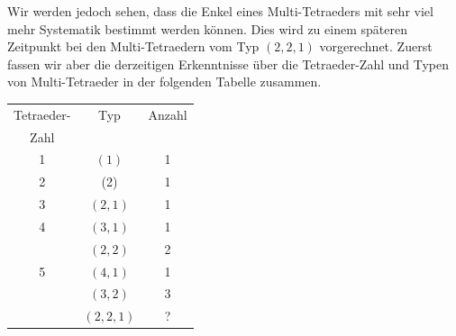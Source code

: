 \documentclass[12pt,titlepage,twoside,cleardoublepage]{article}
\theoremstyle{nummermitklammern}
\numberwithin{equation}{section}
\begin{document}
 Wir werden jedoch sehen, dass die Enkel eines Multi-Tetraeders mit sehr viel mehr Systematik bestimmt werden können. Dies wird zu einem späteren Zeitpunkt bei den Multi-Tetraedern vom Typ $(2,2,1)$ vorgerechnet. Zuerst fassen wir aber die derzeitigen Erkenntnisse über die Tetraeder-Zahl und Typen von Multi-Tetraeder in der folgenden Tabelle zusammen. 
\begin{center}
\begin{tabular}{|c|c|c|}
\hline
Tetraeder- & Typ & Anzahl\\
Zahl& &\\
\hline
1 &$(1)$ &1 \\
\hline
2 &(2) &1\\
\hline
3 &$(2,1)$ &1\\
\hline
4 &$(3,1)$ & 1 \\
 & $(2,2)$& 2\\
\hline
5 & $(4,1)$& 1\\
 &$(3,2)$ & 3\\
 & $(2,2,1)$& ?\\
\hline
\end{tabular}
\end{center}
\end{document}
